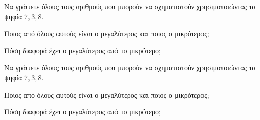 Να γράψετε όλους τους αριθμούς που μπορούν να σχηματιστούν χρησιμοποιώντας τα ψηφία $ 7,3,8 $.
\begin{rlist}
\item Ποιος από όλους αυτούς είναι ο μεγαλύτερος και ποιος ο μικρότερος;
\item Πόση διαφορά έχει ο μεγαλύτερος από το μικρότερο;
\end{rlist}
Να γράψετε όλους τους αριθμούς που μπορούν να σχηματιστούν χρησιμοποιώντας τα ψηφία $ 7,3,8 $.
\begin{rlist}
\item Ποιος από όλους αυτούς είναι ο μεγαλύτερος και ποιος ο μικρότερος;
\item Πόση διαφορά έχει ο μεγαλύτερος από το μικρότερο;
\end{rlist}
